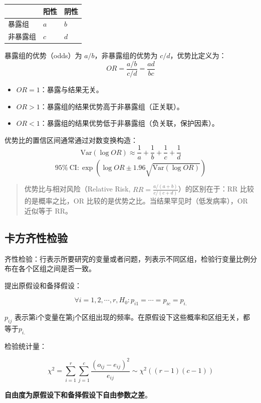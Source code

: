 \documentclass[
]{book}
\providecommand{\tightlist}{%
  \setlength{\itemsep}{0pt}\setlength{\parskip}{0pt}}
\begin{document}
\begin{longtable}[]{@{}lll@{}}
\toprule\noalign{}
& 阳性 & 阴性 \\
\midrule\noalign{}
\endhead
\bottomrule\noalign{}
\endlastfoot
暴露组 & \(a\) & \(b\) \\
非暴露组 & \(c\) & \(d\) \\
\end{longtable}

暴露组的优势（odds）为 \(a/b\)，非暴露组的优势为 \(c/d\)，优势比定义为：
\[
OR = \frac{a/b}{c/d} = \frac{ad}{bc}
\]

\begin{itemize}
\tightlist
\item
  \(OR = 1\)：暴露与结果无关。
\item
  \(OR > 1\)：暴露组的结果优势高于非暴露组（正关联）。
\item
  \(OR < 1\)：暴露组的结果优势低于非暴露组（负关联，保护因素）。
\end{itemize}

优势比的置信区间通常通过对数变换构造：
\[
\text{Var}(\log OR) \approx \frac{1}{a} + \frac{1}{b} + \frac{1}{c} + \frac{1}{d}
\]
\[
95\%\ \text{CI}: \exp\left(\log OR \pm 1.96 \sqrt{\text{Var}(\log OR)}\right)
\]

\begin{quote}
优势比与相对风险（Relative Risk, \(RR = \frac{a/(a+b)}{c/(c+d)}\)）的区别在于：RR 比较的是概率之比，OR 比较的是优势之比。当结果罕见时（低发病率），OR 近似等于 RR。
\end{quote}

\subsection{卡方齐性检验}\label{ux5361ux65b9ux9f50ux6027ux68c0ux9a8c}

齐性检验：行表示所要研究的变量或者问题，列表示不同区组，检验行变量比例分布在各个区组之间是否一致。

提出原假设和备择假设：

\[
\forall i = 1,2,\cdots,r , H_0:p_{i1} = \cdots = p_{ic}=p_{i.}
\]

\(p_{ij}\) 表示第i个变量在第j个区组出现的频率。在原假设下这些概率和区组无关，都等于\(p_{i.}\)

检验统计量：

\[
\chi^2 = \sum_{i=1}^r\sum_{j=1}^c\frac{(o_{ij}-e_{ij})^2}{e_{ij}}\sim \chi^2((r-1)(c-1))
\]

\textbf{自由度为原假设下和备择假设下自由参数之差}。
\end{document}
